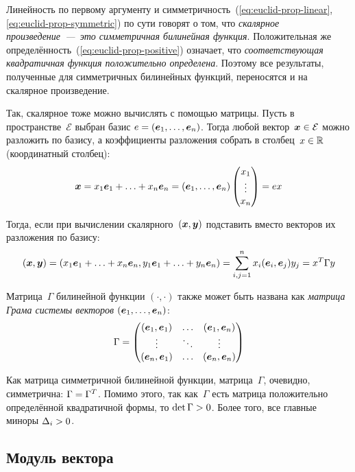 \documentclass[a4paper,12pt]{article}
\begin{document}
  Линейность по первому аргументу и симметричность~(\ref{eq:euclid-prop-linear}, \ref{eq:euclid-prop-symmetric}) по сути говорят о том, что \emph{скалярное произведение~---~это симметричная билинейная функция}.
  Положительная же определённость~(\ref{eq:euclid-prop-positive}) означает, что \emph{соответствующая квадратичная функция положительно определена}.
  Поэтому все результаты, полученные для симметричных билинейных функций, переносятся и на скалярное произведение.
  
  Так, скалярное тоже можно вычислять с помощью матрицы.
  Пусть в пространстве~$\mathcal E$ выбран базис $e \hm= (\bds e_1, \ldots, \bds e_n)$.
  Тогда любой вектор~$\bds x \hm\in \mathcal E$ можно разложить по базису, а коэффициенты разложения собрать в столбец~$x \hm\in \RR$ (координатный столбец):
  \[
    \boldsymbol x = x_1 \boldsymbol e_1 + \ldots + x_n \boldsymbol e_n = (\boldsymbol e_1, \ldots, \boldsymbol e_n) \begin{pmatrix}
      x_1\\
      \vdots\\
      x_n
    \end{pmatrix} = e x
  \]
  
  Тогда, если при вычислении скалярного~$(\boldsymbol x, \boldsymbol y)$ подставить вместо векторов их разложения по базису:
  \[
    (\boldsymbol x, \boldsymbol y) = (x_1 \boldsymbol e_1 + \ldots + x_n \boldsymbol e_n, y_1 \boldsymbol e_1 + \ldots + y_n \boldsymbol e_n)
    = \sum_{i, j = 1}^n x_i (\boldsymbol e_i, \boldsymbol e_j) y_j
    = x^T \Gamma y
  \]
  
  Матрица~$\Gamma$ билинейной функции $(\cdot, \cdot)$ также может быть названа как \emph{матрица Грама системы векторов $(\boldsymbol e_1, \ldots, \boldsymbol e_n)$}:
  \[
    \Gamma = \begin{pmatrix}
      (\boldsymbol e_1, \boldsymbol e_1) & \ldots & (\boldsymbol e_1, \boldsymbol e_n)\\
      \vdots               & \ddots & \vdots\\
      (\boldsymbol e_n, \boldsymbol e_1) & \ldots & (\boldsymbol e_n, \boldsymbol e_n)
    \end{pmatrix}
  \]
  
  Как матрица симметричной билинейной функции, матрица~$\Gamma$, очевидно, симметрична: $\Gamma \hm= \Gamma^T$.
  Помимо этого, так как~$\Gamma$ есть матрица положительно определённой квадратичной формы, то $\det \Gamma \hm> 0$.
  Более того, все главные миноры $\Delta_i \hm> 0$.
  
  
  \subsection{Модуль вектора}
  
\end{document}
